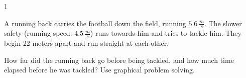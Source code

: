 
\AddToShipoutPicture*{\BackgroundPic}

\addtocounter {ProbNum} {1}

 
{\bf \Large{}} A running back carries the football down the field, running ${5.6~\tfrac{m}{s}}$.  The slower safety (running speed: ${4.5~\tfrac{m}{s}}$) runs towards him and tries to tackle him. They begin 22 meters apart and run straight at each other.  

\bigskip

How far did the running back go before being tackled, and how much time elapsed before he was tackled? Use graphical problem solving.
 
\vfill

\newpage
